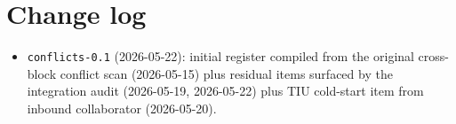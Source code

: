 \documentclass[11pt]{article}
\begin{document}
\section*{Change log}

\begin{itemize}
\item \texttt{conflicts-0.1} (2026-05-22): initial register compiled
from the original cross-block conflict scan
(2026-05-15) plus residual items surfaced by the integration audit
(2026-05-19, 2026-05-22) plus TIU cold-start item from inbound
collaborator (2026-05-20).
\end{itemize}
\end{document}
